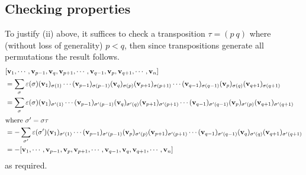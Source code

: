 \subsection{Checking properties}
To justify (ii) above, it suffices to check a transposition \(\tau = (p\ q)\) where (without loss of generality) \(p < q\), then since transpositions generate all permutations the result follows.
\begin{align*}
	 & [\vb v_1, \cdots, \vb v_{p-1}, \vb v_q, \vb v_{p+1}, \cdots, \vb v_{q-1}, \vb v_p, \vb v_{q+1}, \cdots, \vb v_n]                                                                                                                          \\
	 & = \sum_\sigma \varepsilon(\sigma) (\vb v_1)_{\sigma(1)} \cdots (\vb v_{p-1})_{\sigma(p-1)}(\vb v_q)_{\sigma(p)}(\vb v_{p+1})_{\sigma(p+1)} \cdots (\vb v_{q-1})_{\sigma(q-1)}(\vb v_p)_{\sigma(q)}(\vb v_{q+1})_{\sigma(q+1)}             \\
	 & = \sum_\sigma \varepsilon(\sigma) (\vb v_1)_{\sigma'(1)} \cdots (\vb v_{p-1})_{\sigma'(p-1)}(\vb v_q)_{\sigma'(q)}(\vb v_{p+1})_{\sigma'(p+1)} \cdots (\vb v_{q-1})_{\sigma'(q-1)}(\vb v_p)_{\sigma'(p)}(\vb v_{q+1})_{\sigma'(q+1)}      \\
	\intertext{where \(\sigma' = \sigma\tau\)}
	 & = -\sum_{\sigma'} \varepsilon(\sigma') (\vb v_1)_{\sigma'(1)} \cdots (\vb v_{p-1})_{\sigma'(p-1)}(\vb v_p)_{\sigma'(p)}(\vb v_{p+1})_{\sigma'(p+1)} \cdots (\vb v_{q-1})_{\sigma'(q-1)}(\vb v_q)_{\sigma'(q)}(\vb v_{q+1})_{\sigma'(q+1)} \\
	 & = -[\vb v_1, \cdots, \vb v_{p-1}, \vb v_p, \vb v_{p+1}, \cdots, \vb v_{q-1}, \vb v_q, \vb v_{q+1}, \cdots, \vb v_n]
\end{align*}
as required.

